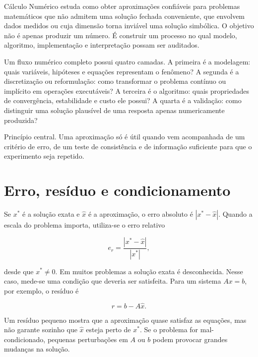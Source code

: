 \documentclass[12pt,a4paper,openany]{book}
\begin{document}
Cálculo Numérico estuda como obter aproximações confiáveis para problemas matemáticos que não admitem uma solução fechada conveniente, que envolvem dados medidos ou cuja dimensão torna inviável uma solução simbólica. O objetivo não é apenas produzir um número. É construir um processo no qual modelo, algoritmo, implementação e interpretação possam ser auditados.



Um fluxo numérico completo possui quatro camadas. A primeira é a modelagem: quais variáveis, hipóteses e equações representam o fenômeno? A segunda é a discretização ou reformulação: como transformar o problema contínuo ou implícito em operações executáveis? A terceira é o algoritmo: quais propriedades de convergência, estabilidade e custo ele possui? A quarta é a validação: como distinguir uma solução plausível de uma resposta apenas numericamente produzida?



\begin{destaque}{Princípio central.}
Uma aproximação só é útil quando vem acompanhada de um critério de erro, de um teste de consistência e de informação suficiente para que o experimento seja repetido.
\end{destaque}



\section{Erro, resíduo e condicionamento}



Se $x^*$ é a solução exata e $\widehat{x}$ é a aproximação, o erro absoluto é $|x^*-\widehat{x}|$. Quando a escala do problema importa, utiliza-se o erro relativo



\[e_r=\frac{|x^*-\widehat{x}|}{|x^*|},\]



desde que $x^*\neq0$. Em muitos problemas a solução exata é desconhecida. Nesse caso, mede-se uma condição que deveria ser satisfeita. Para um sistema $Ax=b$, por exemplo, o resíduo é



\[r=b-A\widehat{x}.\]



Um resíduo pequeno mostra que a aproximação quase satisfaz as equações, mas não garante sozinho que $\widehat{x}$ esteja perto de $x^*$. Se o problema for mal-condicionado, pequenas perturbações em $A$ ou $b$ podem provocar grandes mudanças na solução.
\end{document}
